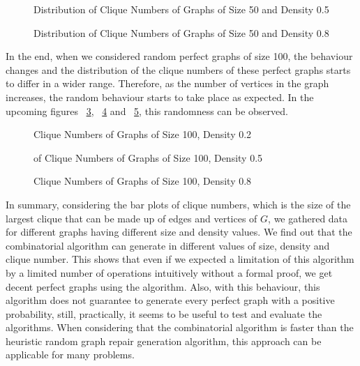 \begin{figure}[H]
    \centering
    
    \caption{Distribution of Clique Numbers of Graphs of Size 50 and Density 0.5}
    \label{fig:comb-alg-clique-70-5}
\end{figure}

\begin{figure}[H]
    \centering
    
    \caption{Distribution of Clique Numbers of Graphs of Size 50 and Density 0.8}
    \label{fig:comb-alg-clique-70-8}
\end{figure}

In the end, when we considered random perfect graphs of size 100, the behaviour changes and the distribution of the clique numbers of these perfect graphs starts to differ in a wider range. Therefore, as the number of vertices in the graph increases, the random behaviour starts to take place as expected. In the upcoming figures ~\ref{fig:comb-alg-clique-100-2}, ~\ref{fig:comb-alg-clique-100-5} and ~\ref{fig:comb-alg-clique-100-8}, this randomness can be observed.

\begin{figure}[H]
    \centering
    
    \caption{Clique Numbers of Graphs of Size 100, Density 0.2}
    \label{fig:comb-alg-clique-100-2}
\end{figure}

\begin{figure}[H]
    \centering
    
    \caption{of Clique Numbers of Graphs of Size 100, Density 0.5}
    \label{fig:comb-alg-clique-100-5}
\end{figure}

\begin{figure}[H]
    \centering
    
    \caption{Clique Numbers of Graphs of Size 100, Density 0.8}
    \label{fig:comb-alg-clique-100-8}
\end{figure}

In summary, considering the bar plots of clique numbers, which is the size of the largest clique that can be made up of edges and vertices of ${G}$, we gathered data for different graphs having different size and density values. We find out that the combinatorial algorithm can generate in different values of size, density and clique number. This shows that even if we expected a limitation of this algorithm by a limited number of operations intuitively without a formal proof, we get decent perfect graphs using the algorithm. Also, with this behaviour, this algorithm does not guarantee to generate every perfect graph with a positive probability, still, practically, it seems to be useful to test and evaluate the algorithms. When considering that the combinatorial algorithm is faster than the heuristic random graph repair generation algorithm, this approach can be applicable for many problems.  